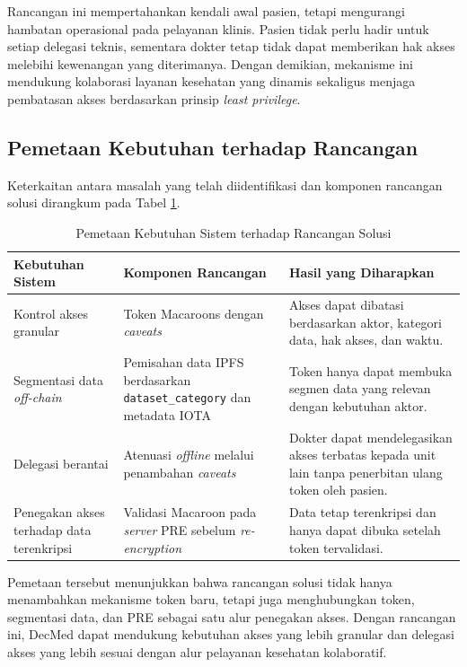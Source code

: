Rancangan ini mempertahankan kendali awal pasien, tetapi mengurangi hambatan operasional pada pelayanan klinis. Pasien tidak perlu hadir untuk setiap delegasi teknis, sementara dokter tetap tidak dapat memberikan hak akses melebihi kewenangan yang diterimanya. Dengan demikian, mekanisme ini mendukung kolaborasi layanan kesehatan yang dinamis sekaligus menjaga pembatasan akses berdasarkan prinsip \textit{least privilege}.

\subsection{Pemetaan Kebutuhan terhadap Rancangan}
\label{subsec:pemetaan-kebutuhan-rancangan}

Keterkaitan antara masalah yang telah diidentifikasi dan komponen rancangan solusi dirangkum pada Tabel \ref{tab:pemetaan-kebutuhan-rancangan}.

\begin{table}[!ht]
	\centering
	\caption{Pemetaan Kebutuhan Sistem terhadap Rancangan Solusi}
	\label{tab:pemetaan-kebutuhan-rancangan}
	\small
	\begin{tabular}{|p{}|p{}|p{}|}
		\hline
		\textbf{Kebutuhan Sistem} & \textbf{Komponen Rancangan} & \textbf{Hasil yang Diharapkan} \\ \hline
		Kontrol akses granular & Token Macaroons dengan \textit{caveats} & Akses dapat dibatasi berdasarkan aktor, kategori data, hak akses, dan waktu. \\ \hline
		Segmentasi data \textit{off-chain} & Pemisahan data IPFS berdasarkan \texttt{dataset\_category} dan metadata IOTA & Token hanya dapat membuka segmen data yang relevan dengan kebutuhan aktor. \\ \hline
		Delegasi berantai & Atenuasi \textit{offline} melalui penambahan \textit{caveats} & Dokter dapat mendelegasikan akses terbatas kepada unit lain tanpa penerbitan ulang token oleh pasien. \\ \hline
		Penegakan akses terhadap data terenkripsi & Validasi Macaroon pada \textit{server} PRE sebelum \textit{re-encryption} & Data tetap terenkripsi dan hanya dapat dibuka setelah token tervalidasi. \\ \hline
	\end{tabular}
\end{table}

Pemetaan tersebut menunjukkan bahwa rancangan solusi tidak hanya menambahkan mekanisme token baru, tetapi juga menghubungkan token, segmentasi data, dan PRE sebagai satu alur penegakan akses. Dengan rancangan ini, DecMed dapat mendukung kebutuhan akses yang lebih granular dan delegasi akses yang lebih sesuai dengan alur pelayanan kesehatan kolaboratif.
